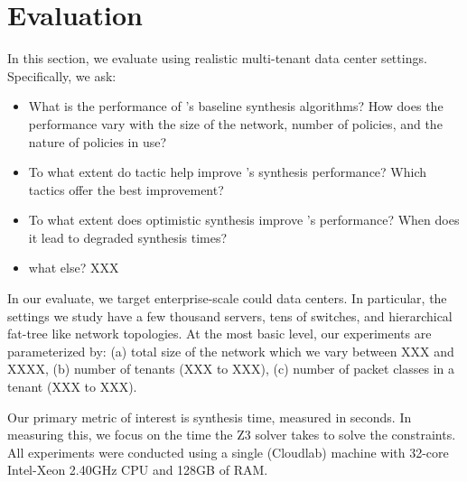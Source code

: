 \section{Evaluation}
In this section, we evaluate \Name using realistic multi-tenant data
center settings. Specifically, we ask:

\begin{itemize}

\item What is the performance of \Name's baseline synthesis
  algorithms? How does the performance vary with the size of the
  network, number of policies, and the nature of policies in use?

\item To what extent do tactic help improve \Name's synthesis
  performance? Which tactics offer the best improvement?

\item To what extent does optimistic synthesis improve \Name's
  performance? When does it lead to degraded synthesis times?

\item what else? XXX

\end{itemize}

In our evaluate, we target enterprise-scale could data centers. In
particular, the settings we study have a few thousand servers, tens of
switches, and hierarchical fat-tree like network topologies. At the
most basic level, our experiments are parameterized by: (a) total size
of the network which we vary between XXX and XXXX, (b) number of
tenants (XXX to XXX), (c) number of packet classes in a tenant (XXX to
XXX). 

Our primary metric of interest is synthesis time, measured in
seconds. In measuring this, we focus on the time the Z3 solver takes
to solve the constraints. All experiments were conducted using a
single (Cloudlab) machine with 32-core Intel-Xeon 2.40GHz CPU and
128GB of RAM.





